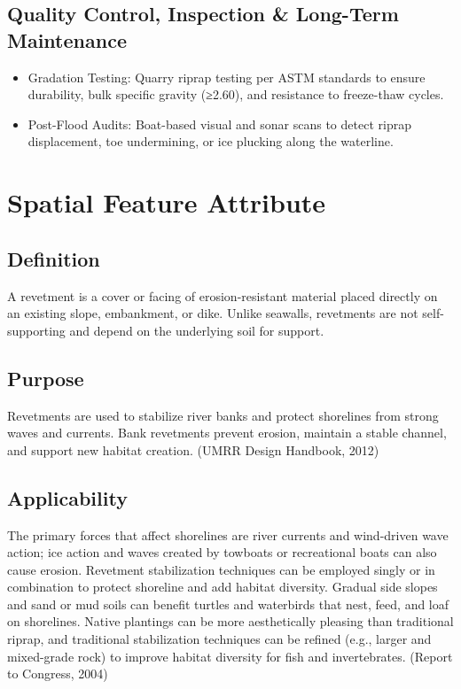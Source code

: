 \documentclass[
  letterpaper,
  DIV=11,
  numbers=noendperiod]{scrreprt}
\begin{document}
\subsection{Quality Control, Inspection \& Long-Term
Maintenance}\label{quality-control-inspection-long-term-maintenance-11}

\begin{itemize}
\item
  Gradation Testing: Quarry riprap testing per ASTM standards to ensure
  durability, bulk specific gravity (≥2.60), and resistance to
  freeze-thaw cycles.
\item
  Post-Flood Audits: Boat-based visual and sonar scans to detect riprap
  displacement, toe undermining, or ice plucking along the waterline.
\end{itemize}

\section{Spatial Feature Attribute}\label{spatial-feature-attribute-8}

\subsection{Definition}\label{definition-10}

A revetment is a cover or facing of erosion-resistant material placed
directly on an existing slope, embankment, or dike. Unlike seawalls,
revetments are not self-supporting and depend on the underlying soil for
support.

\subsection{Purpose}\label{purpose-13}

Revetments are used to stabilize river banks and protect shorelines from
strong waves and currents. Bank revetments prevent erosion, maintain a
stable channel, and support new habitat creation. (UMRR Design Handbook,
2012)

\subsection{Applicability}\label{applicability-11}

The primary forces that affect shorelines are river currents and
wind-driven wave action; ice action and waves created by towboats or
recreational boats can also cause erosion. Revetment stabilization
techniques can be employed singly or in combination to protect shoreline
and add habitat diversity. Gradual side slopes and sand or mud soils can
benefit turtles and waterbirds that nest, feed, and loaf on shorelines.
Native plantings can be more aesthetically pleasing than traditional
riprap, and traditional stabilization techniques can be refined (e.g.,
larger and mixed-grade rock) to improve habitat diversity for fish and
invertebrates. (Report to Congress, 2004)
\end{document}
